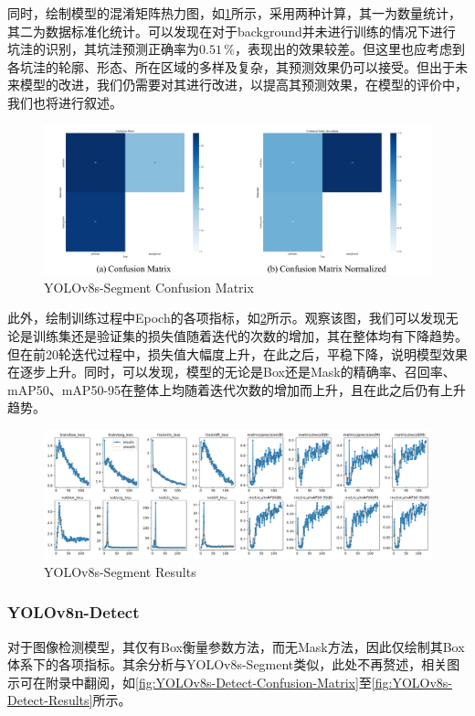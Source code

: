 \documentclass{MathorCupmodeling}
\begin{document}
	同时，绘制模型的混淆矩阵热力图，如\textcolor{blue}{\cref{fig:YOLOv8s-Segment-ConfusionMatrix}}所示，采用两种计算，其一为数量统计，其二为数据标准化统计。可以发现在对于background并未进行训练的情况下进行坑洼的识别，其坑洼预测正确率为$0.51\,\%$，表现出的效果较差。但这里也应考虑到各坑洼的轮廓、形态、所在区域的多样及复杂，其预测效果仍可以接受。但出于未来模型的改进，我们仍需要对其进行改进，以提高其预测效果，在模型的评价中，我们也将进行叙述。
	\begin{figure}[H]
		\centering
		\includegraphics[scale=0.66]{Figures/segment/SegmentConfusionMatrix.pdf}
		\caption{YOLOv8s-Segment Confusion Matrix}
		\label{fig:YOLOv8s-Segment-ConfusionMatrix}
	\end{figure}
	
	此外，绘制训练过程中Epoch的各项指标，如\textcolor{blue}{\cref{fig:YOLOv8s-Segment-Results}}所示。观察该图，我们可以发现无论是训练集还是验证集的损失值随着迭代的次数的增加，其在整体均有下降趋势。但在前20轮迭代过程中，损失值大幅度上升，在此之后，平稳下降，说明模型效果在逐步上升。同时，可以发现，模型的无论是Box还是Mask的精确率、召回率、mAP50、mAP50-95在整体上均随着迭代次数的增加而上升，且在此之后仍有上升趋势。
	\begin{figure}[H]
		\centering
		\includegraphics[scale=0.37]{Figures/segment/SegmentResults.png}
		\caption{YOLOv8s-Segment Results}
		\label{fig:YOLOv8s-Segment-Results}
	\end{figure}
  
	\subsubsection{YOLOv8n-Detect}
	对于图像检测模型，其仅有Box衡量参数方法，而无Mask方法，因此仅绘制其Box体系下的各项指标。其余分析与YOLOv8s-Segment类似，此处不再赘述，相关图示可在附录中翻阅，如\textcolor{blue}{\cref{fig:YOLOv8s-Detect-Confusion-Matrix}}至\textcolor{blue}{\cref{fig:YOLOv8s-Detect-Results}}所示。
	
\end{document}
